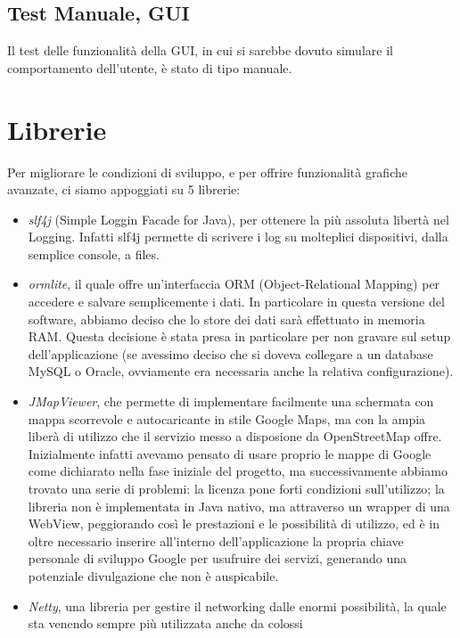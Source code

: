 \documentclass[a4paper,12pt]{report}
\begin{document}
  \subsection{Test Manuale, GUI}
    Il test delle funzionalità della GUI, in cui si sarebbe dovuto simulare il 
    comportamento dell'utente, è stato di tipo manuale. 

\section{Librerie}

  Per migliorare le condizioni di sviluppo, e per offrire funzionalità grafiche 
avanzate, ci siamo appoggiati su 5 librerie:
  \begin{itemize}
    \item \textit{slf4j} (Simple Loggin Facade for Java), per ottenere la più 
assoluta libertà nel Logging. Infatti slf4j permette di scrivere i log su 
molteplici dispositivi, dalla semplice console, a files.
    \item \textit{ormlite}, il quale offre un'interfaccia ORM 
(Object-Relational Mapping) per accedere e salvare semplicemente i dati. In 
particolare in questa versione del software, abbiamo deciso che lo store dei 
dati sarà effettuato in memoria RAM. 
Questa decisione è stata presa in particolare per non gravare sul setup 
dell'applicazione (se avessimo deciso che si doveva collegare a un database 
MySQL o Oracle, ovviamente era necessaria anche la relativa configurazione).
    \item \textit{JMapViewer}, che permette di implementare facilmente una 
schermata con mappa scorrevole e autocaricante in stile Google Maps, ma con la
ampia liberà di utilizzo che il servizio messo a disposione da OpenStreetMap 
offre. 
Inizialmente infatti avevamo pensato di usare proprio le mappe di Google come
dichiarato nella fase iniziale del progetto, ma successivamente 
abbiamo trovato una serie di problemi: la licenza pone forti condizioni 
sull'utilizzo; la libreria non è implementata in Java nativo, ma attraverso 
un wrapper di una WebView, peggiorando così le prestazioni e le possibilità di 
utilizzo, ed è in oltre necessario inserire all'interno dell'applicazione la 
propria chiave personale di sviluppo Google per usufruire dei servizi, 
generando una potenziale divulgazione che non è auspicabile.  
    \item \textit{Netty}, una libreria per gestire il networking dalle enormi 
possibilità, la quale sta venendo sempre più utilizzata anche da colossi 

\end{itemize}
\end{document}
